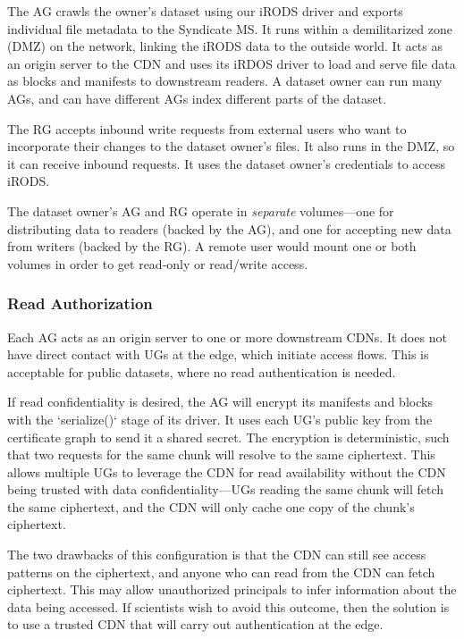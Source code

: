 The AG crawls the owner's dataset using
our iRODS driver and exports individual file metadata to the Syndicate MS.
It runs within a demilitarized zone (DMZ) on the network, linking the iRODS data
to the outside world.  It acts as an origin
server to the CDN and uses its iRDOS driver to load and serve file data as blocks and
manifests to downstream readers.  A dataset owner can run many AGs, and can have
different AGs index different parts of the dataset.

The RG accepts inbound write requests from external users who want to
incorporate their changes to the dataset owner's files.  It also runs in the
DMZ, so it can receive inbound requests.  It uses the dataset owner's
credentials to access iRODS.

The dataset owner's AG and RG operate in \emph{separate} volumes---one for
distributing data to readers (backed by the AG), and one for accepting new data
from writers (backed by the RG).  A remote user would mount one or both volumes
in order to get read-only or read/write access.

\subsubsection{Read Authorization}

Each AG acts as an origin server to one or more downstream CDNs.  It does not
have direct contact with UGs at the edge, which initiate access flows.  This is
acceptable for public datasets, where no read authentication is needed.

If read confidentiality is desired, the AG will encrypt its
manifests and blocks with the `serialize()` stage of its driver.  It uses each
UG's public key from the certificate graph to send it a shared secret.  The
encryption is deterministic, such that two requests for the same chunk will
resolve to the same ciphertext.  This allows multiple UGs to leverage the CDN
for read availability without the CDN being trusted with data
confidentiality---UGs reading the same chunk will fetch the same ciphertext, and
the CDN will only cache one copy of the chunk's ciphertext.

The two drawbacks of this configuration is that the CDN can still see access patterns
on the ciphertext, and anyone who can read from the CDN can fetch ciphertext.
This may allow unauthorized principals to infer information about the data being
accessed.  If scientists wish to avoid this outcome, then the solution is to use
a trusted CDN that will carry out authentication at the edge.

